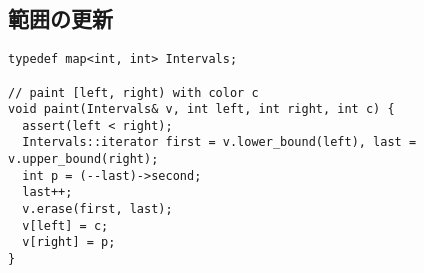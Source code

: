 \subsection{範囲の更新}


\begin{lstlisting}
typedef map<int, int> Intervals;

// paint [left, right) with color c
void paint(Intervals& v, int left, int right, int c) {
  assert(left < right);
  Intervals::iterator first = v.lower_bound(left), last = v.upper_bound(right);
  int p = (--last)->second;
  last++;
  v.erase(first, last);
  v[left] = c;
  v[right] = p;
}
\end{lstlisting}

\newpage
